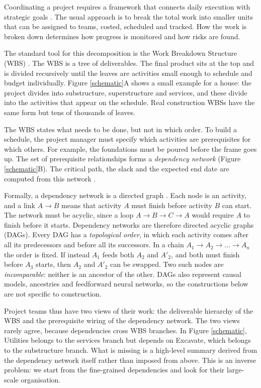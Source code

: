 \documentclass[11pt,a4paper]{article}
\begin{document}
Coordinating a project requires a framework that connects daily execution with strategic goals \cite{pmi2021pmbok, taxen2011system}. The usual approach is to break the total work into smaller units that can be assigned to teams, costed, scheduled and tracked. How the work is broken down determines how progress is monitored and how risks are found.

The standard tool for this decomposition is the Work Breakdown Structure (WBS) \cite{pmi2021pmbok}. The WBS is a tree of deliverables. The final product sits at the top and is divided recursively until the leaves are activities small enough to schedule and budget individually. Figure \ref{schematic}A shows a small example for a house: the project divides into substructure, superstructure and services, and these divide into the activities that appear on the schedule. Real construction WBSs have the same form but tens of thousands of leaves.

The WBS states what needs to be done, but not in which order. To build a schedule, the project manager must specify which activities are prerequisites for which others. For example, the foundations must be poured before the frame goes up. The set of prerequisite relationships forms a {\em dependency network} (Figure \ref{schematic}B). The critical path, the slack and the expected end date are computed from this network \cite{kelley1959cpm}.

Formally, a dependency network is a directed graph \cite{gross2005graph}. Each node is an activity, and a link $A \to B$ means that activity $A$ must finish before activity $B$ can start. The network must be acyclic, since a loop $A \to B \to C \to A$ would require $A$ to finish before it starts. Dependency networks are therefore directed acyclic graphs (DAGs). Every DAG has a {\em topological order}, in which each activity comes after all its predecessors and before all its successors. In a chain $A_{1} \to A_{2} \to \dots \to A_{n}$ the order is fixed. If instead $A_{1}$ feeds both $A_{2}$ and $A'_{2}$, and both must finish before $A_{3}$ starts, then $A_{2}$ and $A'_{2}$ can be swapped. Two such nodes are {\em incomparable}: neither is an ancestor of the other. DAGs also represent causal models, ancestries and feedforward neural networks, so the constructions below are not specific to construction.

Project teams thus have two views of their work: the deliverable hierarchy of the WBS and the prerequisite wiring of the dependency network. The two views rarely agree, because dependencies cross WBS branches. In Figure \ref{schematic}, Utilities belongs to the services branch but depends on Excavate, which belongs to the substructure branch. What is missing is a high-level summary derived from the dependency network itself rather than imposed from above. This is an inverse problem: we start from the fine-grained dependencies and look for their large-scale organisation.
\end{document}
